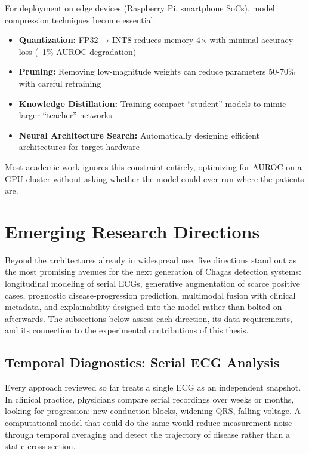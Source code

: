 For deployment on edge devices (Raspberry Pi, smartphone SoCs), model compression techniques become essential:

\begin{itemize}
    \item \textbf{Quantization:} FP32 → INT8 reduces memory 4× with minimal accuracy loss (~1\% AUROC degradation)
    \item \textbf{Pruning:} Removing low-magnitude weights can reduce parameters 50-70\% with careful retraining
    \item \textbf{Knowledge Distillation:} Training compact ``student'' models to mimic larger ``teacher'' networks
    \item \textbf{Neural Architecture Search:} Automatically designing efficient architectures for target hardware
\end{itemize}

Most academic work ignores this constraint entirely, optimizing for AUROC on a GPU cluster without asking whether the model could ever run where the patients are.

\section{Emerging Research Directions}

Beyond the architectures already in widespread use, five directions stand out as the most promising avenues for the next generation of Chagas detection systems: longitudinal modeling of serial ECGs, generative augmentation of scarce positive cases, prognostic disease-progression prediction, multimodal fusion with clinical metadata, and explainability designed into the model rather than bolted on afterwards. The subsections below assess each direction, its data requirements, and its connection to the experimental contributions of this thesis.

\subsection{Temporal Diagnostics: Serial ECG Analysis}

Every approach reviewed so far treats a single ECG as an independent snapshot. In clinical practice, physicians compare serial recordings over weeks or months, looking for progression: new conduction blocks, widening QRS, falling voltage. A computational model that could do the same would reduce measurement noise through temporal averaging and detect the trajectory of disease rather than a static cross-section.

